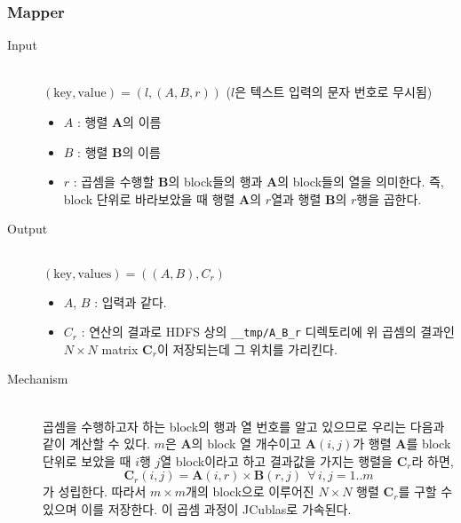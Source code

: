 \documentclass[a4paper]{article}
\begin{document}
\begin{multicols}{2}
\subsubsection{Mapper}
\begin{description}
	\item[Input] \hfill \\
	$(\text{key}, \text{value})  = (l, (A, B, r))$ ($l$은 텍스트 입력의 문자 번호로 무시됨)
	\begin{itemize}
		\item $A$ : 행렬 $\mathbf{A}$의 이름
		\item $B$ : 행렬 $\mathbf{B}$의 이름
		\item $r$ : 곱셈을 수행할 $\mathbf{B}$의 block들의 행과 $\mathbf{A}$의 block들의 열을 의미한다. 즉, block 단위로 바라보았을 때 행렬 $\mathbf{A}$의 $r$열과 행렬 $\mathbf{B}$의 $r$행을 곱한다.
	\end{itemize}
	\item[Output] \hfill \\
	$(\text{key}, \text{values}) = ((A, B), C_r)$
	\begin{itemize}
		\item $A$, $B$ : 입력과 같다.
		\item $C_r$ : 연산의 결과로 HDFS 상의 \texttt{\_\_tmp/A\_B\_r} 디렉토리에 위 곱셈의 결과인 $N \times N$ matrix $\mathbf{C}_r$이 저장되는데 그 위치를 가리킨다.
	\end{itemize}
	\item[Mechanism] \hfill \\
	곱셈을 수행하고자 하는 block의 행과 열 번호를 알고 있으므로 우리는 다음과 같이 계산할 수 있다. $m$은 $\mathbf{A}$의 block 열 개수이고 $\mathbf{A}(i,j)$가 행렬 $\mathbf{A}$를 block 단위로 보았을 때 $i$행 $j$열 block이라고 하고 결과값을 가지는 행렬을 $\mathbf{C}_r$라 하면,
	\begin{equation*}
		\mathbf{C}_r(i,j) = \mathbf{A}(i,r) \times \mathbf{B}(r,j) \:\:\forall \,i,j=1..m
	\end{equation*}
	가 성립한다. 따라서 $m \times m$개의 block으로 이루어진 $N \times N$ 행렬 $\mathbf{C}_r$를 구할 수 있으며 이를 저장한다.
	이 곱셈 과정이 JCublas로 가속된다.
\end{description}

\end{multicols}
\end{document}

